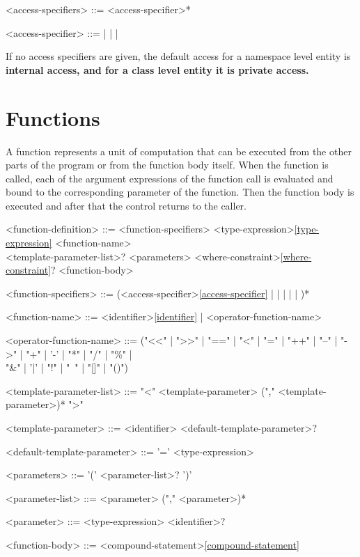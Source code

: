 \documentclass[a4paper,oneside,11pt]{article}
\begin{document}
\begin{grammar}
\label{access-specifiers}<access-specifiers> ::= <access-specifier>*

\label{access-specifier}<access-specifier> ::=  |  |  | 
\end{grammar}

If no access specifiers are given, the default access for a namespace level entity is \bf{internal} access, and for a class level entity it is \bf{private} access.

\section{Functions}

A function represents a unit of computation that can be executed from the other parts of the program or from the function body itself.
When the function is called, each of the argument expressions of the function call is evaluated and bound to the corresponding parameter of the function.
Then the function body is executed and after that the control returns to the caller.

\begin{grammar}
\label{function-definition}<function-definition> ::= <function-specifiers> <type-expression>\ref{type-expression} <function-name>\\
<template-parameter-list>? <parameters> <where-constraint>\ref{where-constraint}? <function-body>

<function-specifiers> ::= (<access-specifier>\ref{access-specifier} |  |  |  |  | )*

\label{function-name}<function-name> ::= <identifier>\ref{identifier} | <operator-function-name>

<operator-function-name> ::=  ("<<" | ">>" | "==" | "<" | "=" | "++" | "--" | "->" | "+" | '-' | "*" | "/" | "\%" |\\
"\&" | '|' | "!" | "~" | "[]" | "()")

\label{template-parameter-list}<template-parameter-list> ::= "<" <template-parameter>  ("," <template-parameter>)* ">"

<template-parameter> ::= <identifier> <default-template-parameter>?

<default-template-parameter> ::= '=' <type-expression>

\label{parameters}<parameters> ::= '(' <parameter-list>? ')'

\label{parameter-list}<parameter-list> ::= <parameter> ("," <parameter>)*

<parameter> ::= <type-expression> <identifier>?

\label{function-body}<function-body> ::= <compound-statement>\ref{compound-statement}

\end{grammar}
\end{document}
